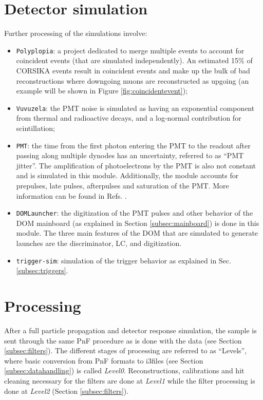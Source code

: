 \section{Detector simulation}
Further processing of the simulations involve:
\vspace{2mm}
\begin{itemize}
\item \texttt{Polyplopia}: a project dedicated to merge multiple events to account for coincident events (that are simulated independently). An estimated 15\% of CORSIKA events result in coincident events and make up the bulk of bad reconstructions where downgoing muons are reconstructed as upgoing (an example will be shown in Figure \ref{fig:coincidentevent});
\item \texttt{Vuvuzela}: the PMT noise is simulated as having an exponential component from  thermal and radioactive decays, and a log-normal contribution for scintillation;
\item \texttt{PMT}: the time from the first photon entering the PMT to the readout after passing along multiple dynodes has an uncertainty, referred to as ``PMT jitter''. The amplification of photoelectrons by the PMT is also not constant and is simulated in this module. Additionally, the module accounts for prepulses, late pulses, afterpulses and saturation of the PMT. More information can be found in Refs. \cite{Abbasi:2010vc,Ma:2009aw}.
\item \texttt{DOMLauncher}: the digitization of the PMT pulses and other behavior of the DOM mainboard (as explained in Section \ref{subsec:mainboard}) is done in this module. The three main features of the DOM that are simulated to generate launches are the discriminator, LC, and digitization.
\item \texttt{trigger-sim}: simulation of the trigger behavior as explained in Sec. \ref{subsec:triggers}.
\end{itemize}

\section{Processing}
\label{sec:processing}
After a full particle propagation and detector response simulation, the sample is sent through the same PnF procedure as is done with the data (see Section \ref{subsec:filters}). The different stages of processing are referred to as ``Levels'', where basic conversion from PnF formats to i3files (see Section \ref{subsec:datahandling}) is called \textit{Level0}. Reconstructions, calibrations and hit cleaning necessary for the filters are done at \textit{Level1} while the filter processing is done at \textit{Level2} (Section \ref{subsec:filters}).

